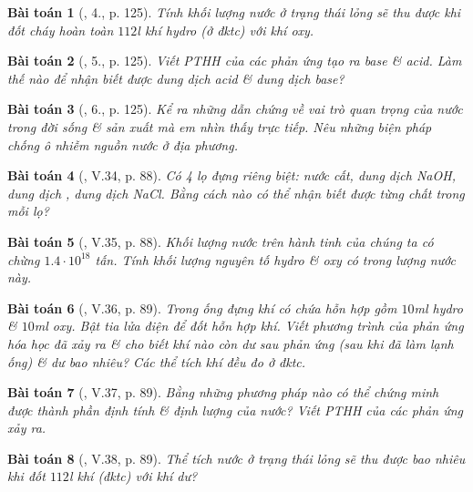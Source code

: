 \documentclass{article}
\newtheorem{baitoan}{Bài toán}
\begin{document}
\begin{baitoan}[\cite{SGK_Hoa_Hoc_8}, 4., p. 125]
	Tính khối lượng nước ở trạng thái lỏng sẽ thu được khi đốt cháy hoàn  toàn $112$\emph{l} khí hydro (ở đktc) với khí oxy.
\end{baitoan}

\begin{baitoan}[\cite{SGK_Hoa_Hoc_8}, 5., p. 125]
	Viết PTHH của các phản ứng tạo ra base \& acid. Làm thế nào để nhận biết được dung dịch acid \& dung dịch base?
\end{baitoan}

\begin{baitoan}[\cite{SGK_Hoa_Hoc_8}, 6., p. 125]
	Kể ra những dẫn chứng về vai trò quan trọng của nước trong đời sống \& sản xuất mà em nhìn thấy trực tiếp. Nêu những biện pháp chống ô nhiễm nguồn nước ở địa phương.
\end{baitoan}

\begin{baitoan}[\cite{Truong_BTNC_Hoa_Hoc_8_2022}, V.34, p. 88]
	Có 4 lọ đựng riêng biệt: nước cất, dung dịch \emph{NaOH}, dung dịch \emph{}, dung dịch \emph{NaCl}. Bằng cách nào có thể nhận biết được từng chất trong mỗi lọ?
\end{baitoan}

\begin{baitoan}[\cite{Truong_BTNC_Hoa_Hoc_8_2022}, V.35, p. 88]
	Khối lượng nước trên hành tinh của chúng ta có chừng $1.4\cdot10^{18}$ tấn. Tính khối lượng nguyên tố hydro \& oxy có trong lượng nước này.
\end{baitoan}

\begin{baitoan}[\cite{Truong_BTNC_Hoa_Hoc_8_2022}, V.36, p. 89]
	Trong ống đựng khí có chứa hỗn hợp gồm $10$\emph{ml} hydro \& $10$\emph{ml} oxy. Bật tia lửa điện để đốt hỗn hợp khí. Viết phương trình của phản ứng hóa học đã xảy ra \& cho biết khí nào còn dư sau phản ứng (sau khi đã làm lạnh ống) \& dư bao nhiêu? Các thể tích khí đều đo ở đktc.
\end{baitoan}

\begin{baitoan}[\cite{Truong_BTNC_Hoa_Hoc_8_2022}, V.37, p. 89]
	Bằng những phương pháp nào có thể chứng minh được thành phần định tính \& định lượng của nước? Viết PTHH của các phản ứng xảy ra.
\end{baitoan}

\begin{baitoan}[\cite{Truong_BTNC_Hoa_Hoc_8_2022}, V.38, p. 89]
	Thể tích nước ở trạng thái lỏng sẽ thu được bao nhiêu khi đốt $112$\emph{l} khí \emph{} (đktc) với khí \emph{} dư?
\end{baitoan}
\end{document}
